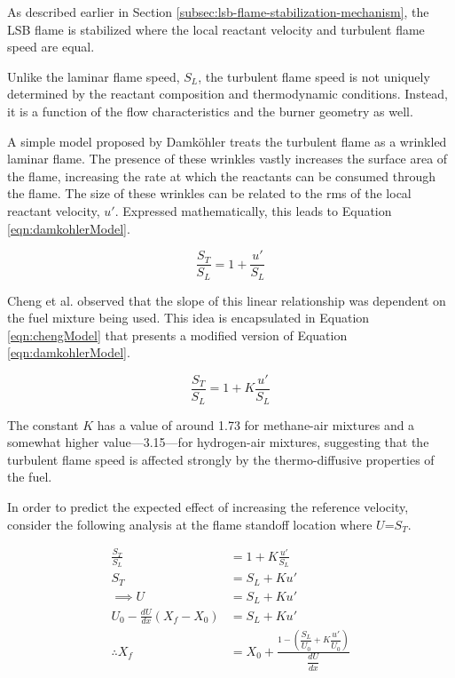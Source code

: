 As described earlier in Section \ref{subsec:lsb-flame-stabilization-mechanism}, the LSB flame is stabilized where the local reactant velocity and turbulent flame speed are equal.

Unlike the laminar flame speed, \(S_L\), the turbulent flame speed is not uniquely determined by the reactant composition and thermodynamic conditions.
Instead, it is a function of the flow characteristics and the burner geometry as well.

A simple model proposed by Damk{\"o}hler\cite{1996-glassman} treats the turbulent flame as a wrinkled laminar flame.
The presence of these wrinkles vastly increases the surface area of the flame, increasing the rate at which the reactants can be consumed through the flame.
The size of these wrinkles can be related to the rms of the local reactant velocity, \(u'\).
Expressed mathematically, this leads to Equation \ref{eqn:damkohlerModel}.

\begin{equation}
\frac{ S_T }{ S_L } = 1 + \frac{ u' }{ S_L }
\label{eqn:damkohlerModel}
\end{equation}

Cheng et al.\cite{2002-cheng,2009-cheng,2010-littlejohn} observed that the slope of this linear relationship was dependent on the fuel mixture being used.
This idea is encapsulated in Equation \ref{eqn:chengModel} that presents a modified version of Equation \ref{eqn:damkohlerModel}.

\begin{equation}
\frac{ S_T }{ S_L } = 1 + K \frac{ u' }{ S_L }
\label{eqn:chengModel}
\end{equation}

The constant \(K\) has a value of around 1.73 for methane-air mixtures and a somewhat higher value---3.15---for hydrogen-air mixtures,\cite{2009-cheng} suggesting that the turbulent flame speed is affected strongly by the thermo-diffusive properties of the fuel.

In order to predict the expected effect of increasing the reference velocity, consider the following analysis at the flame standoff location where \(U\)=\(S_T\).

\begin{align}
\frac{ S_T }{ S_L } &= 1 + K \frac{ u' }{ S_L } \nonumber \\
S_T &= S_L + K u' \nonumber \\
\implies U &= S_L + K u' \nonumber \\
U_0 - \frac{ dU }{ dx } ( X_f - X_0 ) &= S_L + K u' \nonumber \\
\therefore X_f &= X_0 + \frac{1 - \left( \dfrac{ S_L }{ U_0 } + K\dfrac{ u' }{ U_0 } \right) }{ \dfrac{ dU }{ dx } }
\label{eqn:flameImmobility}
\end{align}


